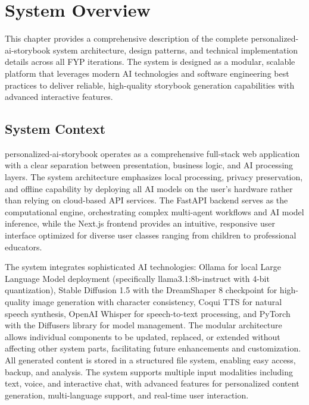 \chapter{System Overview}
\label{sec:system-overview}

This chapter provides a comprehensive description of the complete personalized-ai-storybook system architecture, design patterns, and technical implementation details across all FYP iterations. The system is designed as a modular, scalable platform that leverages modern AI technologies and software engineering best practices to deliver reliable, high-quality storybook generation capabilities with advanced interactive features.

\section{System Context}
personalized-ai-storybook operates as a comprehensive full-stack web application with a clear separation between presentation, business logic, and AI processing layers. The system architecture emphasizes local processing, privacy preservation, and offline capability by deploying all AI models on the user's hardware rather than relying on cloud-based API services. The FastAPI backend serves as the computational engine, orchestrating complex multi-agent workflows and AI model inference, while the Next.js frontend provides an intuitive, responsive user interface optimized for diverse user classes ranging from children to professional educators.

The system integrates sophisticated AI technologies: Ollama for local Large Language Model deployment (specifically llama3.1:8b-instruct with 4-bit quantization), Stable Diffusion 1.5 with the DreamShaper 8 checkpoint for high-quality image generation with character consistency, Coqui TTS \cite{coqui2024} for natural speech synthesis, OpenAI Whisper \cite{whisper2023} for speech-to-text processing, and PyTorch \cite{pytorch2024} with the Diffusers library \cite{diffusers2024} for model management. The modular architecture allows individual components to be updated, replaced, or extended without affecting other system parts, facilitating future enhancements and customization. All generated content is stored in a structured file system, enabling easy access, backup, and analysis. The system supports multiple input modalities including text, voice, and interactive chat, with advanced features for personalized content generation, multi-language support, and real-time user interaction.

